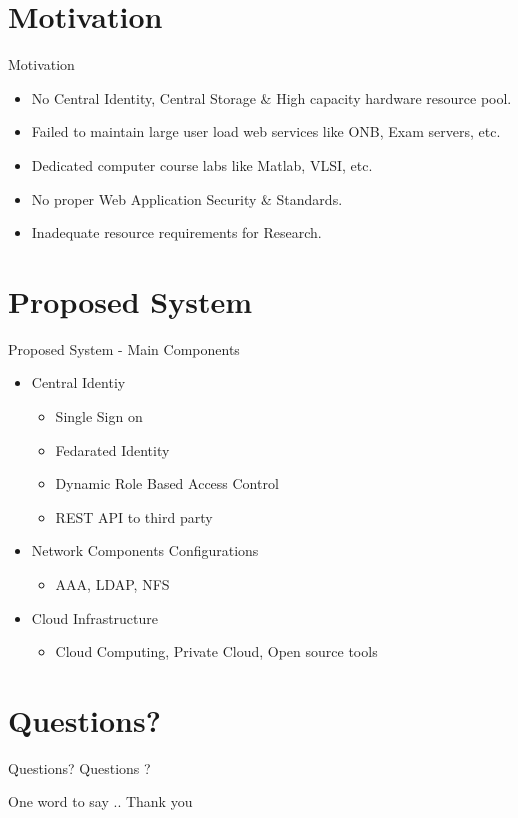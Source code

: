 \documentclass[xcolor=dvipsnames]{beamer}
\begin{document}
\section{Motivation}
\begin{frame}{Motivation}

\begin{itemize}
	\item No Central Identity, Central Storage \& High capacity hardware resource pool.
	\item Failed to maintain large user load web services like ONB, Exam servers, etc.
	\item Dedicated computer course labs like Matlab, VLSI, etc.
	\item No proper Web Application Security \& Standards.
	\item Inadequate resource requirements for Research.
\end{itemize}

\end{frame}



\section{Proposed System}
\begin{frame}{Proposed System -  Main Components}
\begin{itemize}
	\item Central Identiy 
	\begin{itemize}
		\item Single Sign on
		\item Fedarated Identity
		\item Dynamic Role Based Access Control
		\item REST API to third party
	\end{itemize}
	\item Network Components Configurations
	\begin{itemize}
		\item AAA, LDAP, NFS
	\end{itemize}
	\item Cloud Infrastructure
	\begin{itemize}
		\item Cloud Computing, Private Cloud, Open source tools
	\end{itemize}
\end{itemize}
\end{frame}

\section{Questions?}
\begin{frame}{Questions?}
\centering
Questions ?
\end{frame}


\begin{frame}{One word to say ..}
Thank you
\end{frame}
\end{document}
